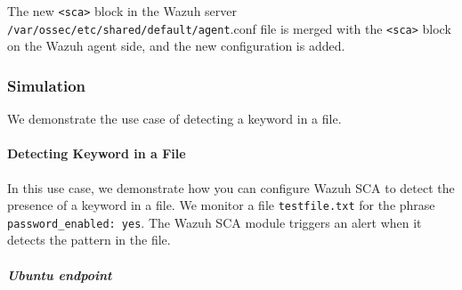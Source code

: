 The new \texttt{<sca>} block in the Wazuh server \texttt{/var/ossec/etc/shared/default/agent}.conf file is merged with the \texttt{<sca>} block on the Wazuh agent side, and the new configuration is added.

\subsubsection{Simulation}
We demonstrate the use case of detecting a keyword in a file.
\paragraph{Detecting Keyword in a File}
In this use case, we demonstrate how you can configure Wazuh SCA to detect the presence of a keyword in a file. We monitor a file \texttt{testfile.txt} for the phrase \texttt{password\_enabled: yes}. The Wazuh SCA module triggers an alert when it detects the pattern in the file.
\subparagraph{Ubuntu endpoint}
